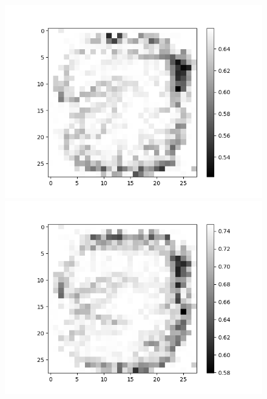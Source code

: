 \begin{figure}[H]
	\centering
	\begin{minipage}[b]{0.45\textwidth}
		\includegraphics[width=\textwidth]{LNN-OR-AND/Digit-2.png}
		\caption{}
		\label{fig:lnn-or-and-digit-2}
	\end{minipage}
	\begin{minipage}[b]{0.45\textwidth}
		\includegraphics[width=\textwidth]{LNN-OR-AND/Digit-3.png}
		\caption{}
		\label{fig:lnn-or-and-digit-3}
	\end{minipage}
	\begin{minipage}[b]{0.45\textwidth}

\end{minipage}
\end{figure}
